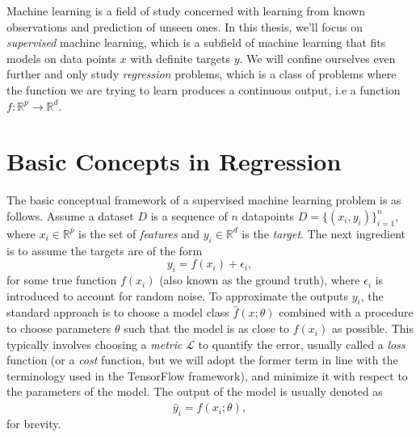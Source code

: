 
Machine learning is a field of study concerned with learning from known observations and prediction of unseen ones. 
In this thesis, we'll focus on \textit{supervised} machine learning, 
which is a subfield of machine learning that fits models on data points $x$ with definite targets $y$. 
We will confine ourselves even further and only study \textit{regression} problems, which is a class of problems where the function 
we are trying to learn produces a continuous output, i.e a function $f : \mathbb{R}^p \to \mathbb{R}^d$.

\section{Basic Concepts in Regression}\label{sec:basic_concepts}

The basic conceptual framework of a supervised machine learning problem is as follows. 
Assume a dataset $D$ is a sequence of $n$ datapoints $D = \{(x_i, y_i)\}_{i=1}^n$,
where $x_i \in \mathbb{R}^p$ is the set of \textit{features} 
and $y_i \in \mathbb{R}^d$ is the \textit{target}. 
The next ingredient is to assume the targets are of the form 
\begin{equation}\label{eq:model_assumption}
	y_i = f(x_i) + \epsilon_i,
\end{equation}
for some true function $f({x}_i)$ (also known as the ground truth), where $\epsilon_i$ is introduced to account for random noise. 
To approximate the outputs $y_i$, the standard approach is to choose a model class $\hat{f}(x; \theta)$ 
combined with a procedure to choose parameters $\theta$ such that the model is as close to $f(x_i)$ as possible. 
This typically involves choosing a \textit{metric} $\mathcal{L}$ to quantify the error, usually called a \textit{loss} function 
(or a \textit{cost} function, but we will adopt the former term in line with the terminology used in the TensorFlow framework), 
and minimize it with respect to the parameters of the model. The output of the model is usually denoted as
\begin{equation}
	\hat{y}_i = \hat{f}(x_i; \theta),
\end{equation}
for brevity.


